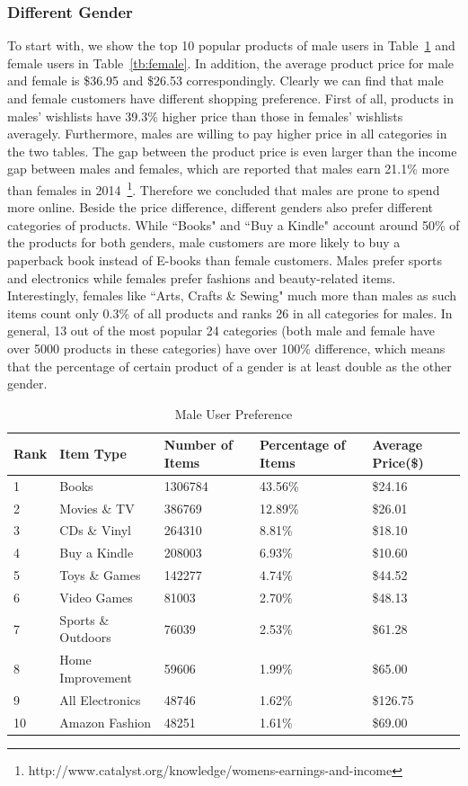 \subsubsection{Different Gender}
\label{differentgender}
To start with, we show the top 10 popular products of male users in Table~\ref{tb:male} and female users in Table~\ref{tb:female}. In addition, the average product price for male and female is \$36.95 and \$26.53 correspondingly. Clearly we can find that male and female customers have different shopping preference. First of all, products in males' wishlists have 39.3\% higher price than those in females' wishlists averagely. Furthermore, males are willing to pay higher price in all categories in the two tables. The gap between the product price is even larger than the income gap between males and females, which are reported that males earn 21.1\% more than females in 2014~\footnote{http://www.catalyst.org/knowledge/womens-earnings-and-income}. Therefore we concluded that males are prone to spend more online. Beside the price difference, different genders also prefer different categories of products. While ``Books" and ``Buy a Kindle" account around 50\% of the products for both genders, male customers are more likely to buy a paperback book instead of E-books than female customers. Males prefer sports and electronics while females prefer fashions and beauty-related items. Interestingly, females like ``Arts, Crafts \& Sewing" much more than males as such items count only 0.3\% of all products and ranks 26 in all categories for males. In general, 13 out of the most popular 24 categories (both male and female have over 5000 products in these categories) have over 100\% difference, which means that the percentage of certain product of a gender is at least double as the other gender. 

\begin{table}[t]
\centering
\caption{Male User Preference}
\label{tb:male}
\begin{adjustbox}{max width=.5\textwidth}
\begin{tabular}{lllll}
Rank & Item Type          & Number of Items & Percentage of Items & Average Price(\$) \\ \hline
1 & Books & 1306784 & 43.56\% & \$24.16 \\
2 & Movies \& TV & 386769 & 12.89\% & \$26.01 \\
3 & CDs \& Vinyl & 264310 & 8.81\% & \$18.10 \\
4 & Buy a Kindle & 208003 & 6.93\% & \$10.60 \\
5 & Toys \& Games & 142277 & 4.74\% & \$44.52 \\
6 & Video Games & 81003 & 2.70\% & \$48.13 \\
7 & Sports \& Outdoors & 76039 & 2.53\% & \$61.28 \\
8 & Home Improvement & 59606 & 1.99\% & \$65.00 \\
9 & All Electronics & 48746 & 1.62\% & \$126.75 \\
10 & Amazon Fashion & 48251 & 1.61\% & \$69.00 \\
\end{tabular}
\end{adjustbox}
\end{table}


